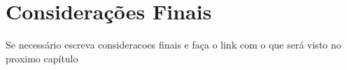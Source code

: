 








\section{Considerações Finais}
Se necessário escreva consideracoes finais e faça o link com o que será visto no proximo capítulo

